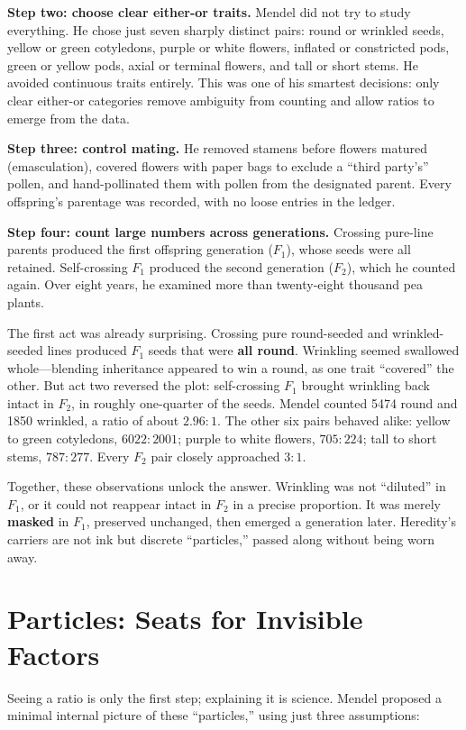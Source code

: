 \textbf{Step two: choose clear either-or traits.} Mendel did not try to study everything. He chose just seven sharply distinct pairs: round or wrinkled seeds, yellow or green cotyledons, purple or white flowers, inflated or constricted pods, green or yellow pods, axial or terminal flowers, and tall or short stems. He avoided continuous traits entirely. This was one of his smartest decisions: only clear either-or categories remove ambiguity from counting and allow ratios to emerge from the data.

\textbf{Step three: control mating.} He removed stamens before flowers matured (emasculation), covered flowers with paper bags to exclude a ``third party's'' pollen, and hand-pollinated them with pollen from the designated parent. Every offspring's parentage was recorded, with no loose entries in the ledger.

\textbf{Step four: count large numbers across generations.} Crossing pure-line parents produced the first offspring generation ($F_1$), whose seeds were all retained. Self-crossing $F_1$ produced the second generation ($F_2$), which he counted again. Over eight years, he examined more than twenty-eight thousand pea plants.

The first act was already surprising. Crossing pure round-seeded and wrinkled-seeded lines produced $F_1$ seeds that were \textbf{all round}. Wrinkling seemed swallowed whole---blending inheritance appeared to win a round, as one trait ``covered'' the other. But act two reversed the plot: self-crossing $F_1$ brought wrinkling back intact in $F_2$, in roughly one-quarter of the seeds. Mendel counted 5474 round and 1850 wrinkled, a ratio of about $2.96:1$. The other six pairs behaved alike: yellow to green cotyledons, $6022:2001$; purple to white flowers, $705:224$; tall to short stems, $787:277$. Every $F_2$ pair closely approached $3:1$.

Together, these observations unlock the answer. Wrinkling was not ``diluted'' in $F_1$, or it could not reappear intact in $F_2$ in a precise proportion. It was merely \textbf{masked} in $F_1$, preserved unchanged, then emerged a generation later. Heredity's carriers are not ink but discrete ``particles,'' passed along without being worn away.

\section{Particles: Seats for Invisible Factors}

Seeing a ratio is only the first step; explaining it is science. Mendel proposed a minimal internal picture of these ``particles,'' using just three assumptions:

